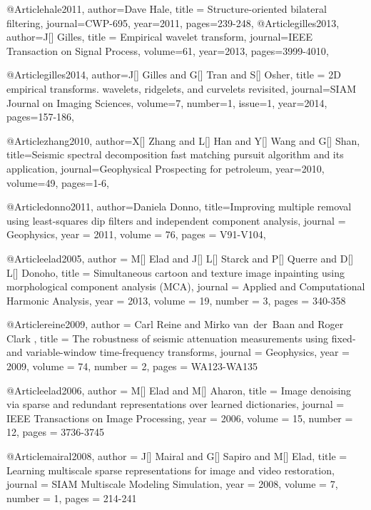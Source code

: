 {@Article{hale2011,
  author={Dave Hale},
  title = {Structure-oriented bilateral filtering},
  journal={CWP-695},
  year=2011,
  pages={239-248},
}
@Article{gilles2013,
  author={J[] Gilles},
  title = {Empirical wavelet transform},
  journal={IEEE Transaction on Signal Process},
  volume={61},
  year=2013,
  pages={3999-4010},
}

@Article{gilles2014,
  author={J[] Gilles and G[] Tran and S[] Osher},
  title = {2D empirical transforms. wavelets, ridgelets, and curvelets revisited},
  journal={SIAM Journal on Imaging Sciences},
  volume={7},
  number=1,
  issue=1,
  year=2014,
  pages={157-186},
}




@Article{zhang2010,
  author={X[] Zhang and L[] Han and Y[] Wang and G[] Shan},
  title={Seismic spectral decomposition fast matching pursuit algorithm and its application},
  journal={Geophysical Prospecting for petroleum},
  year=2010,
  volume=49,
  pages={1-6},
}

@Article{donno2011,
  author={Daniela Donno},
  title={Improving multiple removal using least-squares dip filters
and independent component analysis},
  journal = 	 {Geophysics},
  year = 	 2011,
  volume =	 76,
  pages =	 {V91-V104},
}

@Article{elad2005,
  author = 	 {M[] Elad and J[] L[] Starck and P[] Querre and D[] L[] Donoho},
  title = 	 {Simultaneous cartoon and texture image inpainting using morphological component analysis (MCA)},
  journal = 	 {Applied and Computational Harmonic Analysis},
  year = 	 2013,
  volume = 	 19,
  number = 	 3,
  pages = 	 {340-358}}

@Article{reine2009,
  author = 	 {Carl Reine and Mirko van~der~Baan and Roger Clark },
  title = 	 {The robustness of seismic attenuation measurements using fixed- and variable-window time-frequency transforms},
  journal = 	 {Geophysics},
  year = 	 2009,
  volume = 	 74,
  number = 	 2,
  pages = 	 {WA123-WA135}}



@Article{elad2006,
  author = 	 {M[] Elad and M[] Aharon},
  title = 	 {Image denoising via sparse and redundant representations over learned dictionaries},
  journal = 	 {IEEE Transactions on Image Processing},
  year = 	 2006,
  volume = 	 15,
  number = 	 12,
  pages = 	 {3736-3745}}

@Article{mairal2008,
  author = 	 {J[] Mairal and G[] Sapiro and M[] Elad},
  title = 	 {Learning multiscale sparse representations for image and video restoration},
  journal = 	 {SIAM Multiscale Modeling Simulation},
  year = 	 2008,
  volume = 	 7,
  number = 	 1,
  pages = 	 {214-241}}


}
